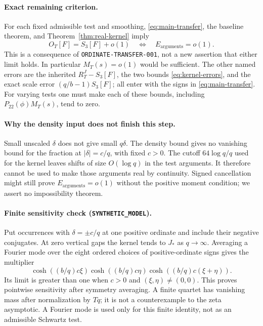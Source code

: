 \documentclass[11pt]{article}
\newcommand{\Ea}{E_{\mathrm{arguments}}}
\begin{document}
\paragraph{Exact remaining criterion.}\label{target:arguments}
For each fixed admissible test and smoothing, \eqref{eq:main-transfer},
the baseline theorem, and Theorem~\ref{thm:real-kernel} imply
\[
 O_T[F]=S_3[F]+o(1)\quad\Longleftrightarrow\quad\Ea=o(1).
\]
This is a consequence of \texttt{ORDINATE-TRANSFER-001}, not a new
assertion that either limit holds. In particular $M_T(s)=o(1)$ would
be sufficient. The other named errors are the inherited
$R_T^J-S_3[F]$, the two bounds \eqref{eq:kernel-errors}, and the exact
scale error $(q/b-1)S_3[F]$; all enter with the signs in
\eqref{eq:main-transfer}. For varying tests one must make each of
these bounds, including $P_{22}(\phi)M_T(s)$, tend to zero.

\paragraph{Why the density input does not finish this step.}
Small unscaled $\delta$ does not give small $q\delta$.
The density bound gives no vanishing bound for the fraction at
$|\delta|=c/q$, with fixed $c>0$. The cutoff $64\log q/q$ used for
the kernel leaves shifts of size $O(\log q)$ in the test arguments.
It therefore cannot be used to make those arguments real by continuity.
Signed cancellation might still prove $\Ea=o(1)$ without the positive
moment condition; we assert no impossibility theorem.

\paragraph{Finite sensitivity check (\texttt{SYNTHETIC\_MODEL}).}
Put occurrences with $\delta=\pm c/q$ at one positive ordinate and
include their negative conjugates. At zero vertical gaps the kernel
tends to $J_*$ as $q\to\infty$. Averaging a Fourier mode over the
eight ordered choices of positive-ordinate signs gives the multiplier
\[
 \cosh((b/q)c\xi)\cosh((b/q)c\eta)
                       \cosh((b/q)c(\xi+\eta)).
\]
Its limit is greater than one when $c>0$ and $(\xi,\eta)\ne(0,0)$.
This proves pointwise sensitivity after symmetry averaging. A finite
quartet has vanishing mass after normalization by $Tq$; it is not a
counterexample to the zeta asymptotic. A Fourier mode is used only for
this finite identity, not as an admissible Schwartz test.
\end{document}
